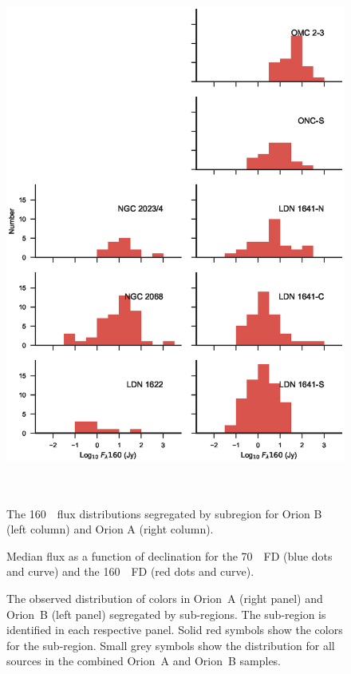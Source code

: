 \documentclass[manuscript]{aastex61}
\begin{document}
\begin{figure}[ht]
\centering
\includegraphics[height=7in]{figures/LF160_byregion.eps}
\caption{The 160~\micron\ flux distributions segregated by subregion for Orion B (left column) and Orion A (right column).\label{fig:fd160regional}}
\end{figure}

\clearpage

\begin{figure}[ht]
\centering
{}
\caption{Median flux as a function of declination for the 70~\micron\ FD (blue dots and curve) and the 160~\micron\ FD (red dots and curve).\label{fig:mdFlux_v_dec}}
\end{figure}

\clearpage

\begin{figure}[ht]
\centering
{}
\caption{The observed distribution of colors in Orion~A (right panel) and Orion~B (left panel) segregated by sub-regions.  The sub-region is identified in each respective panel.  Solid red symbols show the colors for the sub-region.  Small grey symbols show the distribution for all sources in the combined Orion~A and Orion~B samples. \label{fig:clrclr}}
\end{figure}
\end{document}
